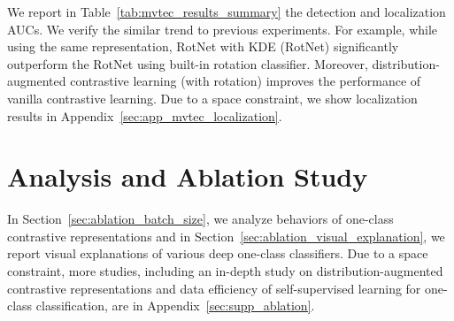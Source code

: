 \documentclass{article} \usepackage{iclr2021_conference,times}
\begin{document}
We report in Table~\ref{tab:mvtec_results_summary} the detection and localization AUCs. We verify the similar trend to previous experiments. For example, while using the same representation, RotNet with KDE (RotNet) significantly outperform the RotNet using built-in rotation classifier. Moreover, distribution-augmented contrastive learning (with rotation) improves the performance of vanilla contrastive learning. Due to a space constraint, we show localization results in Appendix~\ref{sec:app_mvtec_localization}.
\begin{table}[t]
    \centering
    \vspace{-0.1in}
    \caption{Image-level detection and pixel-level localization AUCs on MVTec anomaly detection dataset~\citep{bergmann2019mvtec}. We run experiments 5 times with different random seeds and report the mean and standard deviations. We bold-face the best entry of each row and those within the standard deviation. We use  to denote the use of KDE for an one-class classifier.}
    \label{tab:mvtec_results_summary}
    \vspace{-0.05in}
\end{table}


\vspace{-0.05in}
\section{Analysis and Ablation Study}
\label{sec:ablation}
\vspace{-0.05in}
In Section~\ref{sec:ablation_batch_size}, we analyze behaviors of one-class contrastive representations and in Section~\ref{sec:ablation_visual_explanation}, we report visual explanations of various deep one-class classifiers. Due to a space constraint, more studies, including an in-depth study on distribution-augmented contrastive representations and data efficiency of self-supervised learning for one-class classification, are in Appendix~\ref{sec:supp_ablation}. 
\end{document}

